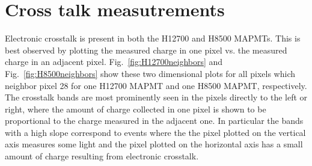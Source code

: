 \section{Cross talk measutrements}

Electronic crosstalk is present in both the H12700 and H8500 MAPMTs. This is best observed by plotting the measured charge in one pixel vs. the measured charge in an adjacent pixel. Fig.~\ref{fig:H12700neighbors} and Fig.~\ref{fig:H8500neighbors} show these two dimensional plots for all pixels which neighbor pixel 28 for one H12700 MAPMT and one H8500 MAPMT, respectively. The crosstalk bands are most prominently seen in the pixels directly to the left or right, where the amount of charge collected in one pixel is shown to be proportional to the charge measured in the adjacent one. In particular the bands with a high slope correspond to events where the the pixel plotted on the vertical axis measures some light and the pixel plotted on the horizontal axis has a small amount of charge resulting from electronic crosstalk.


